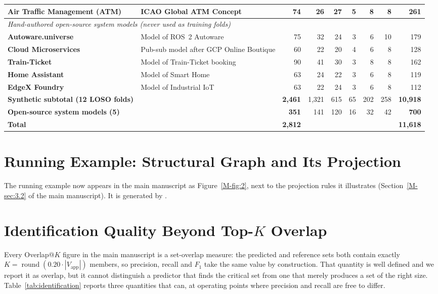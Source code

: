 \documentclass[preprint,3p]{elsarticle}
\begin{document}
\begin{table}[htbp]
{\begin{tabular}{llrrrrrrr}
\textbf{Air Traffic Management (ATM)} & ICAO Global ATM Concept & 74 & 26 & 27 & 5 & 8 & 8 & 261 \\
\midrule
\multicolumn{9}{l}{\textit{Hand-authored open-source system models (never used as training folds)}} \\
\textbf{Autoware.universe \cite{kato2018autoware}} & Model of ROS~2 Autoware & 75 & 32 & 24 & 3 & 6 & 10 & 179 \\
\textbf{Cloud Microservices \cite{google2024onlineboutique}} & Pub-sub model after GCP Online Boutique & 60 & 22 & 20 & 4 & 6 & 8 & 128 \\
\textbf{Train-Ticket \cite{zhou2018trainticket}} & Model of Train-Ticket booking & 90 & 41 & 30 & 3 & 8 & 8 & 162 \\
\textbf{Home Assistant \cite{homeassistant2024}} & Model of Smart Home & 63 & 24 & 22 & 3 & 6 & 8 & 119 \\
\textbf{EdgeX Foundry \cite{edgexfoundry2024}} & Model of Industrial IoT & 63 & 22 & 24 & 3 & 6 & 8 & 112 \\
\midrule
\textbf{Synthetic subtotal (12 LOSO folds)} & & \textbf{2{,}461} & 1{,}321 & 615 & 65 & 202 & 258 & \textbf{10{,}918} \\
\textbf{Open-source system models (5)} & & \textbf{351} & 141 & 120 & 16 & 32 & 42 & \textbf{700} \\
\textbf{Total} & & \textbf{2{,}812} & & & & & & \textbf{11{,}618} \\
\bottomrule
\end{tabular}%
}
\end{table}

\section{Running Example: Structural Graph and Its Projection}
\label{supp:running}

The running example now appears in the main manuscript as Figure~\ref{M-fig:2}, next to the projection rules it illustrates (Section~\ref{M-sec:3.2} of the main manuscript). It is generated by .

\section{Identification Quality Beyond Top-\texorpdfstring{$K$}{K} Overlap}
\label{supp:identification}

Every Overlap@$K$ figure in the main manuscript is a set-overlap measure: the
predicted and reference sets both contain exactly $K = \operatorname{round}(0.20
\cdot |V_{\text{app}}|)$ members, so precision, recall and $F_1$ take the same
value by construction. That quantity is well defined and we report it as
overlap, but it cannot distinguish a predictor that finds the critical set from
one that merely produces a set of the right size. Table~\ref{tab:identification}
reports three quantities that can, at operating points where precision and
recall are free to differ.
\end{document}

